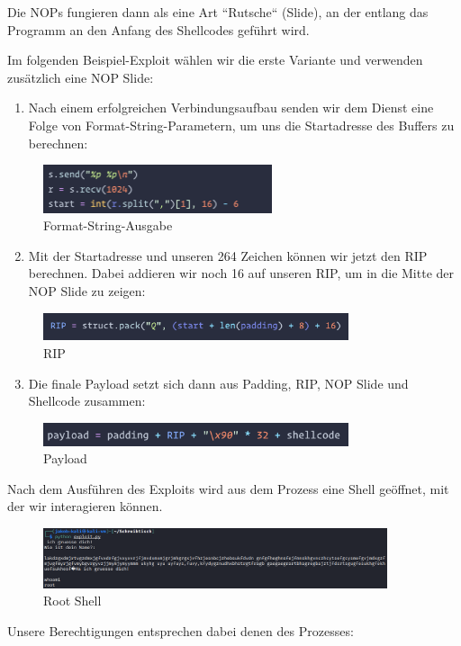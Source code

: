 Die NOPs fungieren dann als eine Art “Rutsche“ (Slide), an der entlang das Programm an den Anfang des
Shellcodes geführt wird. \cite{computerphile} \cite{phrack}

\pagebreak

Im folgenden Beispiel-Exploit wählen wir die erste Variante und verwenden zusätzlich eine NOP Slide:
\begin{enumerate}
    \item Nach einem erfolgreichen Verbindungsaufbau senden wir dem Dienst eine Folge von Format-String-Parametern, um uns die Startadresse des Buffers zu berechnen:
\end{enumerate}
\begin{figure}[h]
    \centering
    \includegraphics[width=0.6\textwidth,height=0.75\textheight,keepaspectratio]{images/format.png}
    \caption{Format-String-Ausgabe}
\end{figure}

\begin{enumerate}
    \setcounter{enumi}{1}
    \item Mit der Startadresse und unseren 264 Zeichen können wir jetzt den RIP berechnen. Dabei addieren wir noch 16 auf unseren RIP, um in die Mitte der NOP Slide zu zeigen:
\end{enumerate}
\begin{figure}[h]
    \centering
    \includegraphics[width=0.8\textwidth,keepaspectratio]{images/rip.png}
    \caption{RIP}
\end{figure}

\begin{enumerate}
    \setcounter{enumi}{2}
    \item Die finale Payload setzt sich dann aus Padding, RIP, NOP Slide und Shellcode zusammen:
\end{enumerate}
\begin{figure}[h]
    \centering
    \includegraphics[width=0.8\textwidth,keepaspectratio]{images/payload.png}
    \caption{Payload}
\end{figure}

Nach dem Ausführen des Exploits wird aus dem Prozess eine Shell geöffnet, mit der wir interagieren können.
\begin{figure}[b!]
    \centering
    \includegraphics[width=0.9\textwidth,keepaspectratio]{images/root.png}
    \caption{Root Shell}
\end{figure}
Unsere Berechtigungen entsprechen dabei denen des Prozesses:
